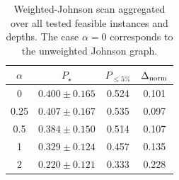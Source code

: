 \begin{table}[t]
\centering
\caption{Weighted-Johnson scan aggregated over all tested feasible instances and depths. The case $\alpha=0$ corresponds to the unweighted Johnson graph.}
\label{tab:weighted-scan}
\begin{tabular}{cccc}
\toprule
$\alpha$ & $P_\star$ & $P_{\leq 5\%}$ & $\Delta_{\rm norm}$\\
\midrule
0 & $0.400\pm 0.165$ & 0.524 & 0.101\\
0.25 & $0.407\pm 0.167$ & 0.535 & 0.097\\
0.5 & $0.384\pm 0.150$ & 0.514 & 0.107\\
1 & $0.329\pm 0.124$ & 0.457 & 0.135\\
2 & $0.220\pm 0.121$ & 0.333 & 0.228\\
\bottomrule
\end{tabular}
\end{table}
